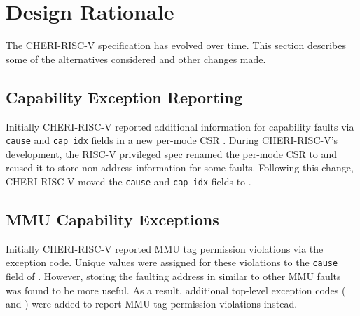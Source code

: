 
%


\section{Design Rationale}

The CHERI-RISC-V specification has evolved over time.  This section
describes some of the alternatives considered and other changes made.

\subsection{Capability Exception Reporting}

Initially CHERI-RISC-V reported additional information for capability
faults via \texttt{cause} and \texttt{cap idx} fields in a new
per-mode CSR \xccsr{}.  During CHERI-RISC-V's development, the RISC-V
privileged spec renamed the per-mode \xbadaddr{} CSR to \xtval{} and
reused it to store non-address information for some faults.  Following
this change, CHERI-RISC-V moved the \texttt{cause} and \texttt{cap
  idx} fields to \xtval{}.

\subsection{MMU Capability Exceptions}

Initially CHERI-RISC-V reported MMU tag permission violations via the
\riscvcheriexception{} exception code.  Unique values were assigned
for these violations to the \texttt{cause} field of \xtval{}.
However, storing the faulting address in \xtval{} similar to other MMU
faults was found to be more useful.  As a result, additional top-level
exception codes (\riscvloadcappagefault{} and
\riscvstorecappagefault{}) were added to report MMU tag permission
violations instead.

